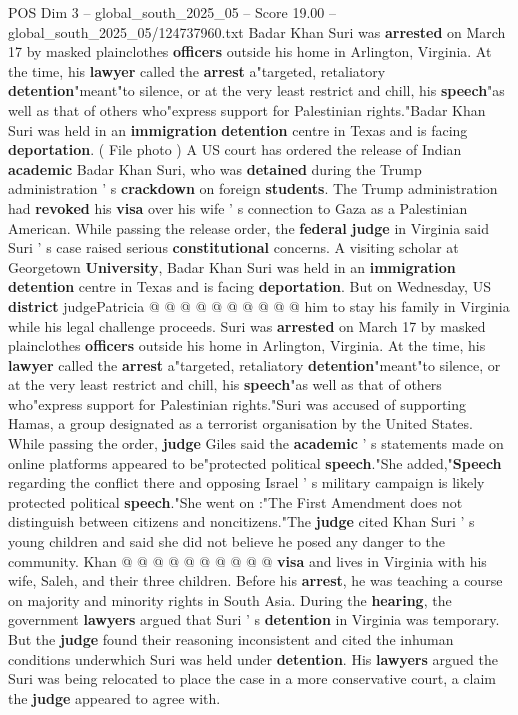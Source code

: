 \begin{textsample}{POS Dim 3 – global\_south\_2025\_05 – Score 19.00 – global\_south\_2025\_05/124737960.txt}  \label{ex:f3_pos_237}
Badar Khan Suri was \textbf{arrested} on March 17 by masked plainclothes \textbf{officers} outside his home in Arlington, Virginia.
At the time, his \textbf{lawyer} called the \textbf{arrest} a"targeted, retaliatory \textbf{detention}"meant"to silence, or at the very least restrict and chill, his \textbf{speech}"as well as that of others who"express support for Palestinian rights."Badar Khan Suri was held in an \textbf{immigration} \textbf{detention} centre in Texas and is facing \textbf{deportation}. ( File photo ) A US court has ordered the release of Indian \textbf{academic} Badar Khan Suri, who was \textbf{detained} during the Trump administration ' s \textbf{crackdown} on foreign \textbf{students}.
The Trump administration had \textbf{revoked} his \textbf{visa} over his wife ' s connection to Gaza as a Palestinian American.
While passing the release order, the \textbf{federal} \textbf{judge} in Virginia said Suri ' s case raised serious \textbf{constitutional} concerns.
A visiting scholar at Georgetown \textbf{University}, Badar Khan Suri was held in an \textbf{immigration} \textbf{detention} centre in Texas and is facing \textbf{deportation}.
But on Wednesday, US \textbf{district} judgePatricia @ @ @ @ @ @ @ @ @ @ him to stay his family in Virginia while his legal challenge proceeds.
Suri was \textbf{arrested} on March 17 by masked plainclothes \textbf{officers} outside his home in Arlington, Virginia.
At the time, his \textbf{lawyer} called the \textbf{arrest} a"targeted, retaliatory \textbf{detention}"meant"to silence, or at the very least restrict and chill, his \textbf{speech}"as well as that of others who"express support for Palestinian rights."Suri was accused of supporting Hamas, a group designated as a terrorist organisation by the United States.
While passing the order, \textbf{judge} Giles said the \textbf{academic} ' s statements made on online platforms appeared to be"protected political \textbf{speech}."She added,"\textbf{Speech} regarding the conflict there and opposing Israel ' s military campaign is likely protected political \textbf{speech}."She went on :"The First Amendment does not distinguish between citizens and noncitizens."The \textbf{judge} cited Khan Suri ' s young children and said she did not believe he posed any danger to the community.
Khan @ @ @ @ @ @ @ @ @ @ \textbf{visa} and lives in Virginia with his wife, Saleh, and their three children.
Before his \textbf{arrest}, he was teaching a course on majority and minority rights in South Asia.
During the \textbf{hearing}, the government \textbf{lawyers} argued that Suri ' s \textbf{detention} in Virginia was temporary.
But the \textbf{judge} found their reasoning inconsistent and cited the inhuman conditions underwhich Suri was held under \textbf{detention}.
His \textbf{lawyers} argued the Suri was being relocated to place the case in a more conservative court, a claim the \textbf{judge} appeared to agree with.

\end{textsample}

